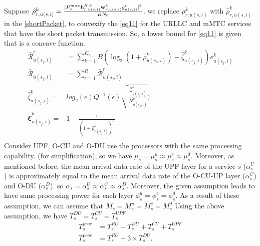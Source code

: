 \documentclass[conference]{IEEEtran}
\begin{document}
Suppose $\hat{\rho}_{r,u(s,i)}^{k} =  \frac{|P_{s}^{max}{\bold{h}_{r,u(s,i)}^{H \: k}} \bold{w}_{r,u(s,i)}^{k} g_{u(s,i)}^r|^2}{BN_0}$. 
we replace ${\rho}_{r,u(s,i)}^{k}$ with $\hat{\rho}_{r,u(s,i)}^{k}$ in the \eqref{shortPacket}, to convexify the \eqref{eq11} for the URLLC and mMTC services that have the short packet transmission.
So, a lower bound for \eqref{eq11} is given that is a concave function.
\begin{equation}
\begin{split}
\bar{\mathcal{R}}_{u(s_j,i)}^{r} &= \sum_{k=1}^{K_{s_j}} B (\log_2({1+ \bar{\rho}_{u(s_2,i)}^{k}})- \hat{\zeta}_{u(s_j,i)}^{k}){e}_{u(s_j,i)}^{k}\\
\bar{\mathcal{R}}_{u(s_j,i)} &= \sum_{r=1}^{R}\bar{\mathcal{R}}_{u(s_j,i)}^{r}\\ 
 \hat{\zeta}_{u(s_j,i)}^{k} =& log_2({e})Q^{-1}(\epsilon) \sqrt{\frac{\hat{\mathfrak{C}}_{u(s_j,i)}^{k}}{N_{u(s_j,i)}^{k}}})\\
 \hat{\mathfrak{C}}_{u(s_j,i)}^{k} =& 1 - \frac{1}{(1+\hat{\rho}_{u(s_j,i)}^{k})^2}\\
\end{split}
\end{equation}
Consider UPF, O-CU and O-DU use the processors with the same processing capability. (for simplification), so we have $\mu_s = \mu_s^u \approx \mu_s^c \approx \mu_s^d $. Moreover, as mentioned before,
the mean arrival data rate of the UPF layer for a service $s$ ($\alpha_{s}^U$) is approximately equal to the mean arrival data rate of the O-CU-UP layer ($\alpha_{s}^C$) and O-DU ($\alpha_{s}^D$). so $\alpha_{s} =\alpha_{s}^U \approx \alpha_{s}^C \approx \alpha_{s}^D$. 
Moreover, the given assumption leads to have same processing power for each layer $\phi_s^u = \phi_s^c =\phi_s^d $.
As a result of these assumption, we can assume that $M_s = M_s^u = M_s^c = M_s^d $
Using the above assumption, we have $T^{DU}_{s} = T^{CU}_{s} = T^{UPF}_{s}$ 
\begin{equation}
\begin{split}
T^{proc}_{s} &=  T^{RU}_{s} + T^{DU}_{s} + T^{CU}_{s} + T^{UPF}_{s} \\
T^{proc}_{s} &=  T^{RU}_{s} + 3\times T^{DU}_{s}.
\end{split}
\end{equation}
\end{document}
